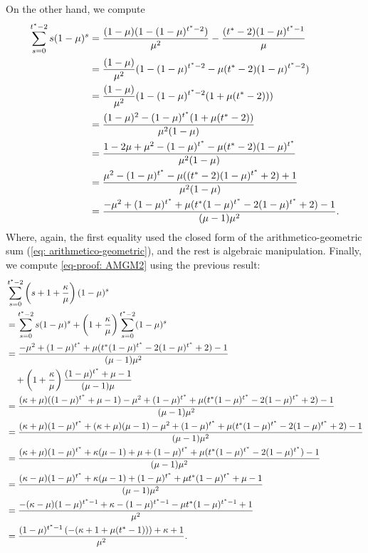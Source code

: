         On the other hand, we compute
        \begin{align*}
            \sum_{s=0}^{t^*-2} s (1-\mu)^s &= \frac{(1-\mu) (1-(1-\mu)^{t^*-2})}{\mu^2} - \frac{(t^*-2) (1-\mu)^{t^*-1}}{\mu}\\
            &= \frac{(1-\mu)}{\mu^2} (1-(1-\mu)^{t^*-2} - \mu(t^*-2)(1-\mu)^{t^*-2})\\
            &= \frac{(1-\mu)}{\mu^2} (1 - (1-\mu)^{t^*-2}(1 + \mu (t^*-2) ) )\\
            &= \frac{(1-\mu)^2 - (1-\mu)^{t^*}(1 + \mu (t^*-2) )}{\mu^2 (1-\mu)}\\
            &= \frac{1 - 2\mu + \mu^2 - (1-\mu)^{t^*} - \mu(t^* -2 )(1-\mu)^{t^*} }{\mu^2 (1-\mu)}\\
            &= \frac{\mu^2 - (1-\mu)^{t^*} - \mu((t^* -2 )(1-\mu)^{t^*} + 2) +1 }{\mu^2 (1-\mu)}\\
             &= \frac{-\mu^2 + (1-\mu)^{t^*} + \mu(t^*(1-\mu)^{t^*} - 2(1-\mu)^{t^*} + 2) - 1}{(\mu - 1)\mu^2}.
        \end{align*}
        Where, again, the first equality used the closed form of the arithmetico-geometric sum (\ref{eq: arithmetico-geometric}), and the rest is algebraic manipulation. Finally, we compute \ref{eq-proof: AMGM2} using the previous result:
        \begin{align*}
        & \sum_{s=0}^{t^*-2} \left(s+1+\frac{\kappa}{\mu} \right) (1-\mu)^s\\
        &=  \sum_{s=0}^{t^*-2} s (1-\mu)^s + \left(1 + \frac{\kappa}{\mu}\right) \sum_{s=0}^{t^*-2} (1-\mu)^s\\
        &= \frac{-\mu^2 + (1-\mu)^{t^*} + \mu(t^*(1-\mu)^{t^*} - 2(1-\mu)^{t^*} + 2) - 1}{(\mu - 1)\mu^2}\\
        &\quad + \left(1 + \frac{\kappa}{\mu}\right) \frac{ (1-\mu)^{t^*} + \mu - 1}{(\mu-1)\mu}\\
        &=  \frac{(\kappa +\mu)((1-\mu)^{t^*} + \mu - 1) -\mu^2 + (1-\mu)^{t^*} + \mu(t^*(1-\mu)^{t^*} - 2(1-\mu)^{t^*} + 2) - 1}{(\mu - 1)\mu^2}\\
        &=  \frac{(\kappa +\mu)(1-\mu)^{t^*} + (\kappa + \mu)(\mu - 1) -\mu^2 + (1-\mu)^{t^*} + \mu(t^*(1-\mu)^{t^*} - 2(1-\mu)^{t^*} + 2) - 1}{(\mu - 1)\mu^2}\\
        &= \frac{(\kappa + \mu)(1-\mu)^{t^*} + \kappa (\mu-1) + \mu + (1-\mu)^{t^*} + \mu(t^*(1-\mu)^{t^*} - 2(1-\mu)^{t^*}) - 1 }{(\mu - 1)\mu^2}\\
        &= \frac{(\kappa - \mu)(1-\mu)^{t^*} + \kappa (\mu-1)+ (1-\mu)^{t^*} + \mu t^*(1-\mu)^{t^*} + \mu - 1 }{(\mu - 1)\mu^2}\\
        &= \frac{-(\kappa - \mu)(1-\mu)^{t^*-1} + \kappa - (1-\mu)^{t^*-1} - \mu t^*(1-\mu)^{t^*-1} + 1 }{\mu^2}\\
        &= \frac{(1 - \mu)^{t^* - 1} \left( -(\kappa + 1 + \mu (t^* - 1)) \right) + \kappa + 1}{\mu^2}. 
    \end{align*}
    \hfill\Halmos

